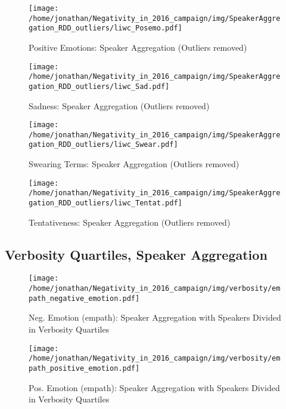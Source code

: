 \begin{figure}[h]\centering
	\texttt{[image: /home/jonathan/Negativity\_in\_2016\_campaign/img/SpeakerAggregation\_RDD\_outliers/liwc\_Posemo.pdf]}
	\caption{Positive Emotions: Speaker Aggregation (Outliers removed)}
	\label{fig: sa_Positive Emotions}
\end{figure}

\begin{figure}[h]\centering
	\texttt{[image: /home/jonathan/Negativity\_in\_2016\_campaign/img/SpeakerAggregation\_RDD\_outliers/liwc\_Sad.pdf]}
	\caption{Sadness: Speaker Aggregation (Outliers removed)}
	\label{fig: sa_Sadness}
\end{figure}

\begin{figure}[h]\centering
	\texttt{[image: /home/jonathan/Negativity\_in\_2016\_campaign/img/SpeakerAggregation\_RDD\_outliers/liwc\_Swear.pdf]}
	\caption{Swearing Terms: Speaker Aggregation (Outliers removed)}
	\label{fig: sa_Swearing Terms}
\end{figure}

\begin{figure}[h]\centering
	\texttt{[image: /home/jonathan/Negativity\_in\_2016\_campaign/img/SpeakerAggregation\_RDD\_outliers/liwc\_Tentat.pdf]}
	\caption{Tentativeness: Speaker Aggregation (Outliers removed)}
	\label{fig: sa_Tentativeness}
\end{figure}

\clearpage
\pagebreak

\subsection{Verbosity Quartiles, Speaker Aggregation}

\begin{figure}[h]\centering
	\texttt{[image: /home/jonathan/Negativity\_in\_2016\_campaign/img/verbosity/empath\_negative\_emotion.pdf]}
	\caption{Neg. Emotion (empath): Speaker Aggregation with Speakers Divided in Verbosity Quartiles}
	\label{fig: verbosity_Neg. Emotion (empath)}
\end{figure}

\begin{figure}[h]\centering
	\texttt{[image: /home/jonathan/Negativity\_in\_2016\_campaign/img/verbosity/empath\_positive\_emotion.pdf]}
	\caption{Pos. Emotion (empath): Speaker Aggregation with Speakers Divided in Verbosity Quartiles}
	\label{fig: verbosity_Pos. Emotion (empath)}
\end{figure}

